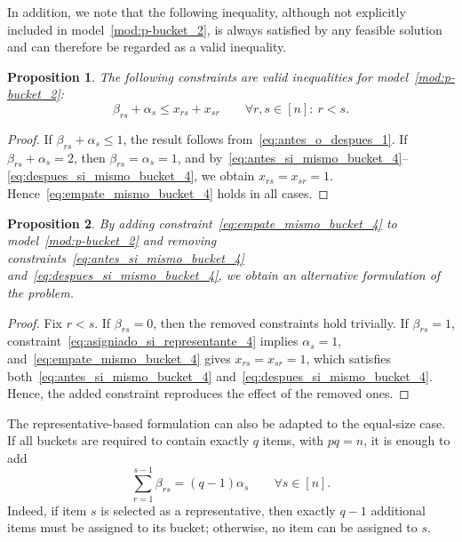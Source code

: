 \documentclass[pdflatex,basic,Numbered]{jnl}%
\theoremstyle{plain}
\newtheorem{prop}{Proposition}
\theoremstyle{remark}
\theoremstyle{thmstyleone}%
\theoremstyle{thmstylethree}%
\begin{document}
In addition, we note that the following inequality, although not explicitly included in model~\eqref{mod:p-bucket_2}, is always satisfied by any feasible solution and can therefore be regarded as a valid inequality.

\begin{prop}\label{prop:empate_mismo_bucket_4}
The following constraints are valid inequalities for model~\eqref{mod:p-bucket_2}:
\begin{equation}
\beta_{rs}+\alpha_s\le x_{rs}+x_{sr}
\qquad \forall r,s\in[n]:\ r<s.
\label{eq:empate_mismo_bucket_4}
\end{equation}
\end{prop}

\begin{proof}
If \(\beta_{rs}+\alpha_s\le 1\), the result follows from~\eqref{eq:antes_o_despues_1}. If \(\beta_{rs}+\alpha_s=2\), then \(\beta_{rs}=\alpha_s=1\), and by~\eqref{eq:antes_si_mismo_bucket_4}--\eqref{eq:despues_si_mismo_bucket_4}, we obtain \(x_{rs}=x_{sr}=1\). Hence~\eqref{eq:empate_mismo_bucket_4} holds in all cases.
\end{proof}

\begin{prop}\label{prop:alternative_representative}
By adding constraint~\eqref{eq:empate_mismo_bucket_4} to model~\eqref{mod:p-bucket_2} and removing constraints~\eqref{eq:antes_si_mismo_bucket_4} and~\eqref{eq:despues_si_mismo_bucket_4}, we obtain an alternative formulation of the problem.
\end{prop}

\begin{proof}
Fix \(r<s\). If \(\beta_{rs}=0\), then the removed constraints hold trivially. If \(\beta_{rs}=1\), constraint~\eqref{eq:asigniado_si_representante_4} implies \(\alpha_s=1\), and~\eqref{eq:empate_mismo_bucket_4} gives \(x_{rs}=x_{sr}=1\), which satisfies both~\eqref{eq:antes_si_mismo_bucket_4} and~\eqref{eq:despues_si_mismo_bucket_4}. Hence, the added constraint reproduces the effect of the removed ones.
\end{proof}

The representative-based formulation can also be adapted to the equal-size case. If all buckets are required to contain exactly \(q\) items, with \(pq=n\), it is enough to add
\begin{equation}\label{eq:equal_bucket_sizes_representative}
    \sum_{r=1}^{s-1}\beta_{rs}=(q-1)\alpha_s
    \qquad \forall s\in[n].
\end{equation}
Indeed, if item \(s\) is selected as a representative, then exactly \(q-1\) additional items must be assigned to its bucket; otherwise, no item can be assigned to \(s\).
\end{document}
